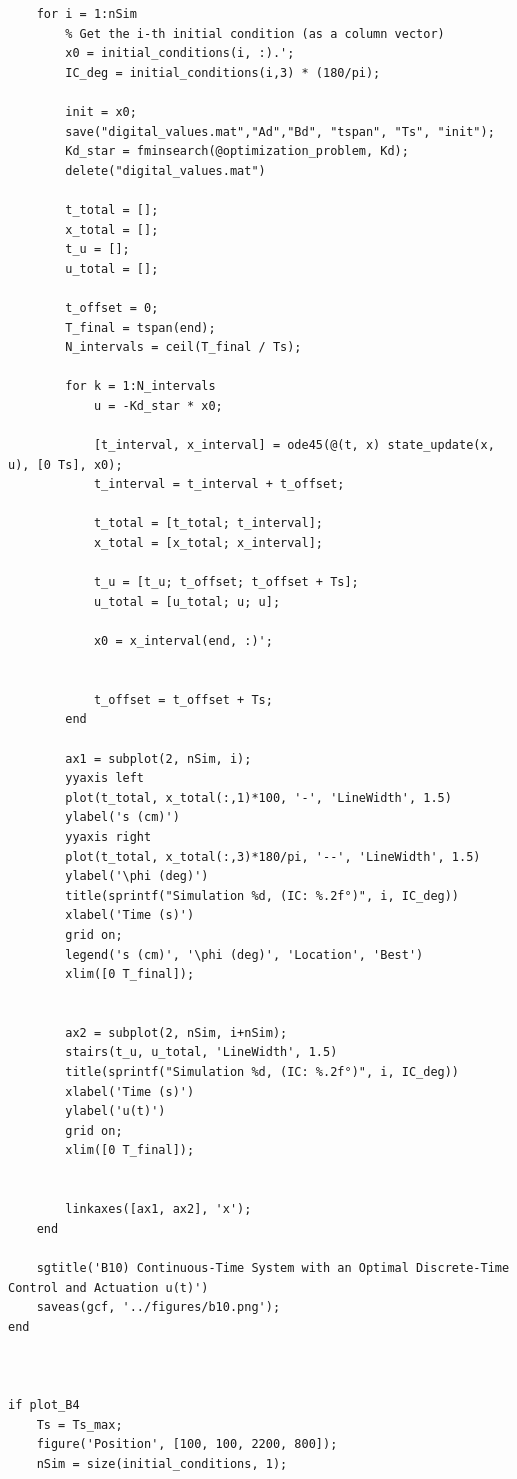 \documentclass{article}
\begin{document}
\begin{verbatim}
    for i = 1:nSim
        % Get the i-th initial condition (as a column vector)
        x0 = initial_conditions(i, :).';
        IC_deg = initial_conditions(i,3) * (180/pi);

        init = x0;
        save("digital_values.mat","Ad","Bd", "tspan", "Ts", "init");
        Kd_star = fminsearch(@optimization_problem, Kd);
        delete("digital_values.mat")
        
        t_total = [];
        x_total = [];
        t_u = [];
        u_total = [];
        
        t_offset = 0;
        T_final = tspan(end);
        N_intervals = ceil(T_final / Ts);
        
        for k = 1:N_intervals
            u = -Kd_star * x0;
            
            [t_interval, x_interval] = ode45(@(t, x) state_update(x, u), [0 Ts], x0);
            t_interval = t_interval + t_offset;

            t_total = [t_total; t_interval];
            x_total = [x_total; x_interval];

            t_u = [t_u; t_offset; t_offset + Ts];
            u_total = [u_total; u; u];

            x0 = x_interval(end, :)';
            

            t_offset = t_offset + Ts;
        end

        ax1 = subplot(2, nSim, i);
        yyaxis left
        plot(t_total, x_total(:,1)*100, '-', 'LineWidth', 1.5)
        ylabel('s (cm)')
        yyaxis right
        plot(t_total, x_total(:,3)*180/pi, '--', 'LineWidth', 1.5)
        ylabel('\phi (deg)')
        title(sprintf("Simulation %d, (IC: %.2f°)", i, IC_deg))
        xlabel('Time (s)')
        grid on;
        legend('s (cm)', '\phi (deg)', 'Location', 'Best')
        xlim([0 T_final]);
        

        ax2 = subplot(2, nSim, i+nSim);
        stairs(t_u, u_total, 'LineWidth', 1.5)
        title(sprintf("Simulation %d, (IC: %.2f°)", i, IC_deg))
        xlabel('Time (s)')
        ylabel('u(t)')
        grid on;
        xlim([0 T_final]);
        

        linkaxes([ax1, ax2], 'x');
    end
    
    sgtitle('B10) Continuous-Time System with an Optimal Discrete-Time Control and Actuation u(t)')
    saveas(gcf, '../figures/b10.png');
end



if plot_B4
    Ts = Ts_max;
    figure('Position', [100, 100, 2200, 800]);
    nSim = size(initial_conditions, 1);
    

\end{verbatim}
\end{document}
